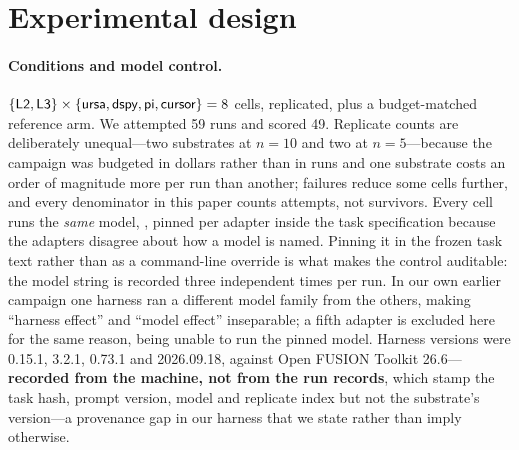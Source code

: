 \section{Experimental design}
\label{sec:design}

\paragraph{Conditions and model control.}
$\{\textsf{L2}{}, \textsf{L3}{}\} \times \{\textsf{ursa}, \textsf{dspy}, \textsf{pi}, \textsf{cursor}\}
= 8$ cells, replicated, plus a budget-matched \Lzero{} reference arm. We
attempted 59 runs and scored 49. Replicate counts are deliberately unequal---two
substrates at $n=10$ and two at $n=5$---because the campaign was budgeted in
dollars rather than in runs and one substrate costs an order of magnitude more
per run than another; failures reduce some cells further, and every denominator
in this paper counts attempts, not survivors. Every cell runs the \emph{same}
model, , pinned per adapter inside the task specification because
the adapters disagree about how a model is named. Pinning it in the frozen task
text rather than as a command-line override is what makes the control auditable:
the model string is recorded three independent times per run. In our own earlier
campaign one harness ran a different model family from the others, making
``harness effect'' and ``model effect'' inseparable; a fifth adapter is excluded
here for the same reason, being unable to run the pinned model. Harness versions
were  0.15.1,  3.2.1,  0.73.1 and 
2026.09.18, against Open FUSION Toolkit 26.6---\textbf{recorded from the
machine, not from the run records}, which stamp the task hash, prompt version,
model and replicate index but not the substrate's version---a provenance gap in
our harness that we state rather than imply otherwise.

